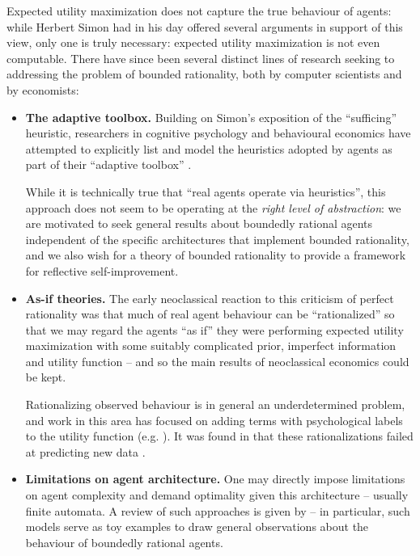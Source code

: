 Expected utility maximization does not capture the true behaviour of agents: while Herbert Simon had in his day offered several arguments \cite{oldreview_simon} in support of this view, only one is truly necessary: expected utility maximization is not even computable. There have since been several distinct lines of research seeking to addressing the problem of bounded rationality, both by computer scientists and by economists:

\begin{itemize}
    
    \item \textbf{The adaptive toolbox.} Building on Simon's exposition of the ``sufficing'' heuristic, researchers in cognitive psychology and behavioural economics have attempted to explicitly list and model the heuristics adopted by agents as part of their ``adaptive toolbox'' \cite{oldreview_heuristics}.

    While it is technically true that ``real agents operate via heuristics'', this approach does not seem to be operating at the \emph{right level of abstraction}: we are motivated to seek general results about boundedly rational agents independent of the specific architectures that implement bounded rationality, and we also wish for a theory of bounded rationality to provide a framework for reflective self-improvement.

    \item \textbf{As-if theories.} The early neoclassical reaction to this criticism of perfect rationality was that much \cite{rationalization_savage, rationalization_savage2} of real agent behaviour can be ``rationalized'' so that we may regard the agents ``as if'' they were performing expected utility maximization with some suitably complicated prior, imperfect information and utility function -- and so the main results of neoclassical economics could be kept. 

    Rationalizing observed behaviour is in general an underdetermined problem, and work in this area has focused on adding terms with psychological labels to the utility function (e.g. \cite{rationalization_discounting, rationalization_inattention, rationalization_inattention_2, rationalization_recall}). It was found in \cite{norationalization_friedman} that these rationalizations failed at predicting new data \cite{oldreview_gigerenzer}. 

    \item \textbf{Limitations on agent architecture.} One may directly impose limitations on agent complexity and demand optimality given this architecture -- usually finite automata. A review of such approaches is given by \cite{oldreview_aumann} -- in particular, such models serve as toy examples to draw general observations about the behaviour of boundedly rational agents. 


\end{itemize}
